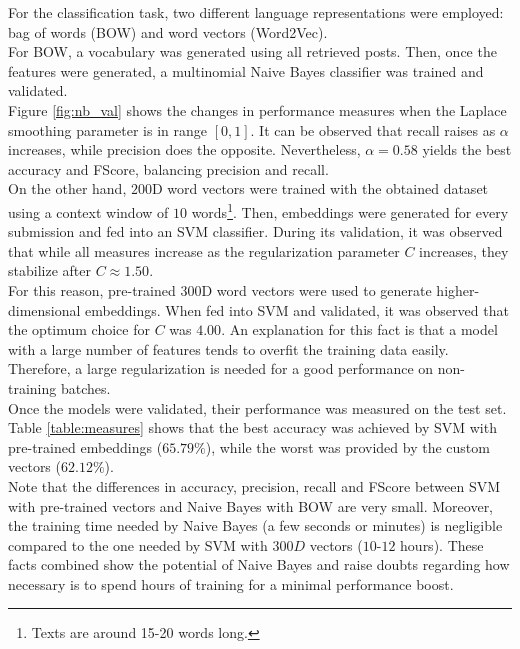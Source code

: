 \documentclass[11pt,a4paper]{article}
\begin{document}
For the classification task, two different language representations were employed: bag
of words (BOW) and word vectors (Word2Vec).\\
For BOW, a vocabulary was generated using all retrieved posts. Then, once the features
were generated, a multinomial Naive Bayes classifier was trained and validated.\\
Figure \ref{fig:nb_val} shows the changes in performance measures when the Laplace
smoothing parameter is in range $[0, 1]$. It can be observed that recall raises as
$\alpha$ increases, while precision does the opposite. Nevertheless, $\alpha = 0.58$
yields the best accuracy and FScore, balancing precision and recall.\\
On the other hand, $200$D word vectors were trained with the obtained dataset using
a context window of $10$ words\footnote{Texts are around 15-20 words long.}.
Then, embeddings were generated for every submission and fed into an SVM classifier.
During its validation, it was observed that while all measures increase as the
regularization parameter $C$ increases, they stabilize after $C \approx 1.50$.\\
For this reason, pre-trained $300$D word vectors were used to generate
higher-dimensional embeddings. When fed into SVM and validated, it was observed that
the optimum choice for $C$ was $4.00$. An explanation for this fact is that a model with
a large number of features tends to overfit the training data easily. Therefore, a large
regularization is needed for a good performance on non-training batches.\\

Once the models were validated, their performance was measured on the test set.\\
Table \ref{table:measures} shows that the best accuracy was achieved by SVM with
pre-trained embeddings ($65.79\%$), while the worst was provided by the custom
vectors ($62.12\%$).\\
Note that the differences in accuracy, precision, recall and FScore between SVM with
pre-trained vectors and Naive Bayes with BOW are very small. Moreover, the training
time needed by Naive Bayes (a few seconds or minutes) is negligible compared to
the one needed by SVM with $300D$ vectors ($10$-$12$ hours). These facts
combined show the potential of Naive Bayes and raise doubts regarding how necessary
is to spend hours of training for a minimal performance boost.
\end{document}
